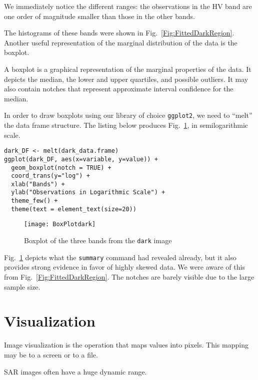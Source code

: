 We immediately notice the different ranges: the observations in the HV band are one order of magnitude smaller than those in the other bands.

The histograms of these bands were shown in Fig.~\ref{Fig:FittedDarkRegion}.
Another useful representation of the marginal distribution of the data is the boxplot.

A boxplot is a graphical representation of the marginal properties of the data.
It depicts the median, the lower and upper quartiles, and possible outliers.
It may also contain notches that represent approximate interval confidence for the median.

In order to draw boxplots using our library of choice \texttt{ggplot2}, we need to ``melt'' the data frame structure.
The listing below produces Fig.~\ref{Fig:BoxplotDark}, in semilogarithmic scale.

\begin{lstlisting}
dark_DF <- melt(dark_data.frame)
ggplot(dark_DF, aes(x=variable, y=value)) + 
  geom_boxplot(notch = TRUE) + 
  coord_trans(y="log") + 
  xlab("Bands") +
  ylab("Observations in Logarithmic Scale") + 
  theme_few() +
  theme(text = element_text(size=20))
\end{lstlisting}

\begin{figure}
\centering
\texttt{[image: BoxPlotdark]}
\caption{Boxplot of the three bands from the \texttt{dark} image}\label{Fig:BoxplotDark}
\end{figure}

Fig.~\ref{Fig:BoxplotDark} depicts what the \texttt{summary} command had revealed already, but it also provides strong evidence in favor of highly skewed data.
We were aware of this from Fig.~\ref{Fig:FittedDarkRegion}.
The notches are barely visible due to the large sample size.

\section{Visualization}

Image visualization is the operation that maps values into pixels\cite{IPVG:2008}.
This mapping may be to a screen or to a file.

SAR images often have a huge dynamic range.